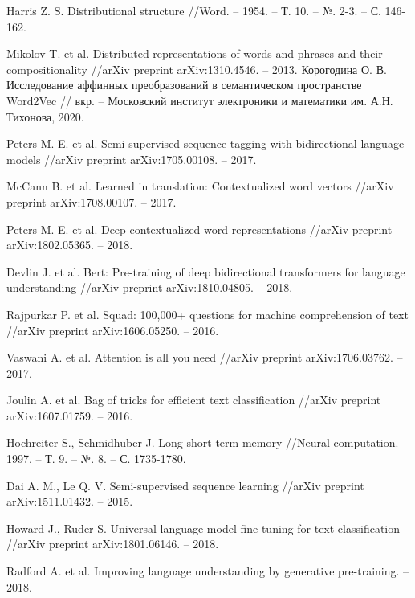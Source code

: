 \documentclass[a4paper,14pt]{article}
\begin{document}
\newpage 
\renewcommand{\refname}{{\normalsize \hfill Список использованных источников \hfill}} 

\begin{thebibliography}{30}
Harris Z. S. Distributional structure //Word. – 1954. – Т. 10. – №. 2-3. – С. 146-162.

Mikolov T. et al. Distributed representations of words and phrases and their compositionality //arXiv preprint arXiv:1310.4546. – 2013.
Корогодина  О. В. Исследование аффинных преобразований в семантическом пространстве Word2Vec // вкр. – Московский институт электроники и математики им. А.Н. Тихонова, 2020.

Peters M. E. et al. Semi-supervised sequence tagging with bidirectional language models //arXiv preprint arXiv:1705.00108. – 2017.

McCann B. et al. Learned in translation: Contextualized word vectors //arXiv preprint arXiv:1708.00107. – 2017.

Peters M. E. et al. Deep contextualized word representations //arXiv preprint arXiv:1802.05365. – 2018.

Devlin J. et al. Bert: Pre-training of deep bidirectional transformers for language understanding //arXiv preprint arXiv:1810.04805. – 2018.

Rajpurkar P. et al. Squad: 100,000+ questions for machine comprehension of text //arXiv preprint arXiv:1606.05250. – 2016.

Vaswani A. et al. Attention is all you need //arXiv preprint arXiv:1706.03762. – 2017.

Joulin A. et al. Bag of tricks for efficient text classification //arXiv preprint arXiv:1607.01759. – 2016.

Hochreiter S., Schmidhuber J. Long short-term memory //Neural computation. – 1997. – Т. 9. – №. 8. – С. 1735-1780.

Dai A. M., Le Q. V. Semi-supervised sequence learning //arXiv preprint arXiv:1511.01432. – 2015.

Howard J., Ruder S. Universal language model fine-tuning for text classification //arXiv preprint arXiv:1801.06146. – 2018.

Radford A. et al. Improving language understanding by generative pre-training. – 2018.


\end{thebibliography}
\end{document}
